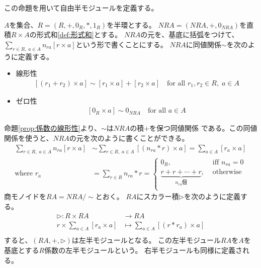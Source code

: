 	この命題を用いて自由半モジュールを定義する。

	\begin{definition}[自由半モジュール]\label{def:自由半モジュール} %
		$A$を集合、$R=(R,+,0_R,*,1_R)$を半環とする。
		$NRA=(NRA,+,0_{NRA})$を直積$R\times A$の形式和\ref{def:形式和}とする。
		$NRA$の元を、基底に括弧をつけて、
		$\sum_{r\in R,\;a\in A}n_{ra}[r\times a]$という形で書くことにする。
		$NRA$に同値関係$\sim$を次のように定義する。
		\begin{itemize}
			\item 線形性
			\begin{equation}\begin{split} %
				[(r_1+r_2)\times a] \sim [r_1\times a] + [r_2\times a]
					\quad\text{for all }r_1,r_2\in R,\;a\in A
			\end{split}\end{equation} %
			\item ゼロ性
			\begin{equation}\begin{split} %
				[0_R\times a] \sim 0_{NRA}
					\quad\text{for all }a\in A
			\end{split}\end{equation} %
		\end{itemize}
		命題\ref{prop:係数の線形性}より、$\sim$は$NRA$の積$+$を保つ同値関係
		である。この同値関係を使うと、$NRA$の元を次のように書くことができる。
		\begin{equation*}\label{eq:形式和から自由半モジュールへ}\begin{split} %
			\sum_{r\in R,\;a\in A}n_{ra}[r\times a]
				&\sim \sum_{r\in R,\;a\in A}[(n_{ra}*r)\times a]
					= \sum_{a\in A}[r_a\times a] \\
			\text{where } r_a &= \sum_{r\in R}n_{ra}*r=\begin{cases} %
				0_R, &\text{ iff } n_{ra}=0 \\
				\underbrace{r+r+\cdots+r}_{n_{ra}\text{個}}, &\text{ otherwise } \\
				\end{cases} %
		\end{split}\end{equation*} %
		商モノイドを$RA=NRA/\sim$とおく。
		$RA$にスカラー積$\rhd$を次のように定義する。
		\begin{equation}\begin{split} %
			\rhd: R\times RA &\to RA \\
				r\times \sum_{a\in A}[r_a\times a] &\mapsto \sum_{a\in A}[(r*r_a)\times a] \\
		\end{split}\end{equation} %
		すると、$(RA,+,\rhd)$は左半モジュールとなる。
		この左半モジュール$RA$を$A$を基底とする$R$係数の左半モジュールという。
		右半モジュールも同様に定義される。
	\end{definition} %

